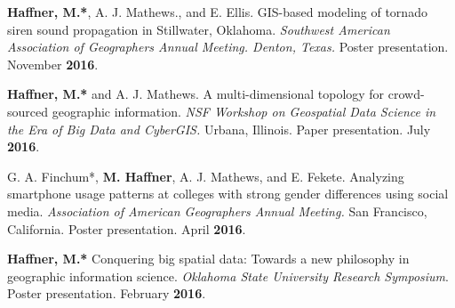 \begin{cventries}
   \cventry
      {}
      {}
      {}
      {}
      {
        \begin{cvitems}
          \vspace{-2mm}
        \item {\textbf{Haffner, M.*}, A. J. Mathews., and E. Ellis. GIS-based
            modeling of tornado siren sound propagation in Stillwater, Oklahoma.
            \textit{Southwest American Association of Geographers Annual
              Meeting. Denton, Texas.} Poster presentation. November
            \textbf{2016}.}
            \end{cvitems}
          } %

   \cventry
      {}
      {}
      {}
      {}
      {
        \begin{cvitems}
          \vspace{-2mm}
        \item {\textbf{Haffner, M.*} and A. J. Mathews. A multi-dimensional
            topology for crowd-sourced geographic information. \textit{NSF
              Workshop on Geospatial Data Science in the Era of Big Data and
              CyberGIS.} Urbana, Illinois. Paper presentation. July
            \textbf{2016}.}
          \end{cvitems}
        }

   \cventry
      {}
      {}
      {}
      {}
      {
        \begin{cvitems}
          \vspace{-2mm}
        \item G. A. Finchum*, {\textbf{M. Haffner}, A. J. Mathews, and E.
            Fekete. Analyzing smartphone usage patterns at colleges with strong
            gender differences using social media. \textit{Association of
              American Geographers Annual Meeting.} San Francisco, California.
            Poster presentation. April \textbf{2016}.}
            \end{cvitems}
            }

   \cventry
      {}
      {}
      {}
      {}
      {
        \begin{cvitems}
          \vspace{-2mm}
        \item {\textbf{Haffner, M.*} Conquering big spatial data: Towards a new
            philosophy in geographic information science. \textit{Oklahoma State
              University Research Symposium}. Poster presentation. February
            \textbf{2016}.}
              \end{cvitems}
            }


\end{cventries}
